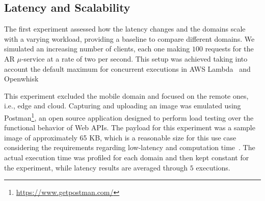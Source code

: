 \subsection{Latency and Scalability} 



The first experiment assessed how the latency changes and the domains scale with a varying workload, providing a baseline to compare different domains. We simulated an increasing number of clients, each one making $100$ requests for the AR $\mu$-service at a rate of two per second. This setup was achieved taking into account the default maximum for concurrent executions in AWS Lambda~\cite{AWSLambda}
and Openwhisk~\cite{OpenWhisk}

This experiment excluded the mobile domain and focused on the remote ones, i.e., edge and cloud. Capturing and uploading an image was emulated using Postman\footnote{\url{https://www.getpostman.com/}}, an open source application designed to perform load testing over the functional behavior of Web APIs. The payload for this experiment was a sample image of approximately 65 KB, which is a reasonable size for this use case considering the requirements regarding low-latency and computation time~\cite{rodriguez16mobile}. The actual execution time was profiled for each domain and then kept constant for the experiment, while latency results are averaged through $5$ executions.



